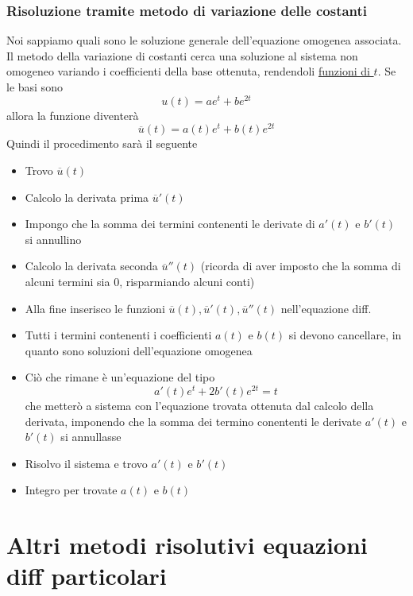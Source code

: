 \subsubsection*{Risoluzione tramite metodo di variazione delle costanti}
Noi sappiamo quali sono le soluzione generale dell'equazione omogenea associata. Il metodo della variazione di costanti cerca una soluzione al sistema non omogeneo variando i coefficienti della base ottenuta, rendendoli \underline{funzioni di $ t $}. Se le basi sono
\[
	u\left( t \right) = a e^{t}+ b e^{2t}
\]
allora la funzione diventerà
\[
	\overline{u}\left( t \right) = a\left( t \right) e^{t} +  b\left( t \right) e^{2t}
\]
Quindi il procedimento sarà il seguente
\begin{itemize}
	\item Trovo $ \overline{u}\left( t \right)  $
	\item Calcolo la derivata prima $ \overline{u}' \left( t \right)  $
	\item Impongo che la somma dei termini contenenti le derivate di $ a'\left( t \right)  $ e $ b'\left( t \right)  $ si annullino
	\item Calcolo la derivata seconda $ \overline{u}''\left( t \right) $ (ricorda di aver imposto che la somma di alcuni termini sia 0, risparmiando alcuni conti)
	\item Alla fine inserisco le funzioni $ \overline{u}\left( t \right) , \overline{u}'\left( t \right) , \overline{u}''\left( t \right)  $ nell'equazione diff.
	\item Tutti i termini contenenti i coefficienti $ a\left( t \right)  $ e $ b\left( t \right)  $ si devono cancellare, in quanto sono soluzioni dell'equazione omogenea
	\item Ciò che rimane è un'equazione del tipo
	      \[
		      a'\left( t \right) e^{t}+ 2b'\left( t \right) e^{2t}=t
	      \]
	      che metterò a sistema con l'equazione trovata ottenuta dal calcolo della derivata, imponendo che la somma dei termino conententi le derivate $ a'\left( t \right)  $ e $ b'\left( t \right)  $ si annullasse
	\item Risolvo il sistema e trovo $ a'\left( t \right)  $ e $ b'\left( t \right)  $
	\item Integro per trovate $ a\left( t \right)  $ e $ b\left( t \right)  $
\end{itemize}
\section{Altri metodi risolutivi equazioni diff particolari}
